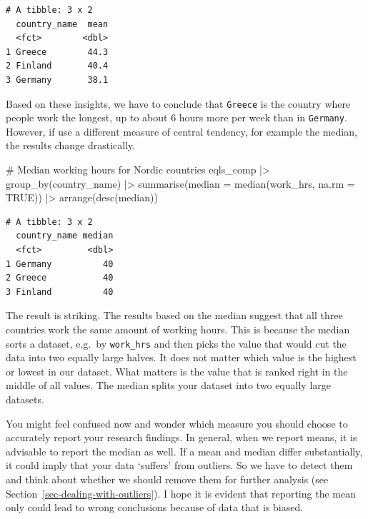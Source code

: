 \documentclass[
  letterpaper,
]{krantz}
\makeatletter
\newenvironment{Shaded}{\begin{snugshade}}{\end{snugshade}}
\newcommand{\AttributeTok}[1]{\textcolor[rgb]{0.40,0.45,0.13}{#1}}
\newcommand{\CommentTok}[1]{\textcolor[rgb]{0.37,0.37,0.37}{#1}}
\newcommand{\ConstantTok}[1]{\textcolor[rgb]{0.56,0.35,0.01}{#1}}
\newcommand{\FunctionTok}[1]{\textcolor[rgb]{0.28,0.35,0.67}{#1}}
\newcommand{\NormalTok}[1]{\textcolor[rgb]{0.00,0.23,0.31}{#1}}
\newcommand{\SpecialCharTok}[1]{\textcolor[rgb]{0.37,0.37,0.37}{#1}}
\newenvironment{kframe}{%
\medskip{}
\setlength{\fboxsep}{.8em}
 \def\at@end@of@kframe{}%
 \ifinner\ifhmode%
  \def\at@end@of@kframe{\end{minipage}}%
  \begin{minipage}{\columnwidth}%
 \fi\fi%
 \def\FrameCommand##1{\hskip\@totalleftmargin \hskip-\fboxsep
 \colorbox{shadecolor}{##1}\hskip-\fboxsep
     \hskip-\linewidth \hskip-\@totalleftmargin \hskip\columnwidth}%
 \MakeFramed {\advance\hsize-\width
   \@totalleftmargin\z@ \linewidth\hsize
   \@setminipage}}%
 {\par\unskip\endMakeFramed%
 \at@end@of@kframe}
\renewenvironment{Shaded}{\begin{kframe}}{\end{kframe}}
\makeatother
\begin{document}
\begin{verbatim}
# A tibble: 3 x 2
  country_name  mean
  <fct>        <dbl>
1 Greece        44.3
2 Finland       40.4
3 Germany       38.1
\end{verbatim}

Based on these insights, we have to conclude that \texttt{Greece} is the
country where people work the longest, up to about 6 hours more per week
than in \texttt{Germany}. However, if use a different measure of central
tendency, for example the median, the results change drastically.

\begin{Shaded}
\begin{Highlighting}[]
\CommentTok{\# Median working hours for Nordic countries}
\NormalTok{eqls\_comp }\SpecialCharTok{|\textgreater{}}
  \FunctionTok{group\_by}\NormalTok{(country\_name) }\SpecialCharTok{|\textgreater{}}
  \FunctionTok{summarise}\NormalTok{(}\AttributeTok{median =} \FunctionTok{median}\NormalTok{(work\_hrs, }\AttributeTok{na.rm =} \ConstantTok{TRUE}\NormalTok{)) }\SpecialCharTok{|\textgreater{}}
  \FunctionTok{arrange}\NormalTok{(}\FunctionTok{desc}\NormalTok{(median))}
\end{Highlighting}
\end{Shaded}

\begin{verbatim}
# A tibble: 3 x 2
  country_name median
  <fct>         <dbl>
1 Germany          40
2 Greece           40
3 Finland          40
\end{verbatim}

The result is striking. The results based on the median suggest that all
three countries work the same amount of working hours. This is because
the median sorts a dataset, e.g.~by \texttt{work\_hrs} and then picks
the value that would cut the data into two equally large halves. It does
not matter which value is the highest or lowest in our dataset. What
matters is the value that is ranked right in the middle of all values.
The median splits your dataset into two equally large datasets.

You might feel confused now and wonder which measure you should choose
to accurately report your research findings. In general, when we report
means, it is advisable to report the median as well. If a mean and
median differ substantially, it could imply that your data `suffers'
from outliers. So we have to detect them and think about whether we
should remove them for further analysis (see
Section~\ref{sec-dealing-with-outliers}). I hope it is evident that
reporting the mean only could lead to wrong conclusions because of data
that is biased.
\end{document}
